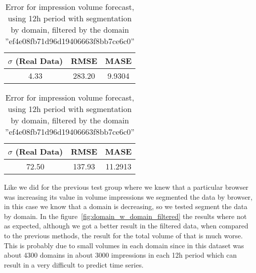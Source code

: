 \begin{table}[!ht]
\centering
\footnotesize
\begin{minipage}[t]{0.45\linewidth}
\centering
\footnotesize
\begin{tabular}{ccc}
 $\sigma$ (Real Data) & RMSE & MASE   \\ \hline
4.33 & 283.20 & 9.9304 \\
\end{tabular}

\vspace{0.5cm}

\caption[Error Volume
impression forecast, domain]{Error for impression volume
forecast, using 12h period with segmentation by domain}
\label{tab:err_domain_w_segmentation_domain}


\end{minipage}
\quad
\begin{minipage}[t]{0.45\linewidth}
\centering
\footnotesize
\begin{tabular}{ccc}
 $\sigma$ (Real Data) & RMSE & MASE   \\ \hline
72.50 & 137.93 & 11.2913 \\
\end{tabular}

\vspace{0.5cm}

\caption[Error Volume
impression forecast, domain, filtered]{Error for impression volume
forecast, using 12h period with segmentation by domain, filtered by the domain ''ef4e08fb71d96d19406663f8bb7ce6c0'' }
\label{tab:err_domain_w_segmentation_domain_filtered}


\end{minipage}

\end{table}

Like we did for the previous test group where we knew that a particular browser
was increasing its value in volume impressions we segmented the data by browser,
in this case we know that a domain is decreasing, so we tested segment the data
by domain. In the figure~\ref{fig:domain_w_domain_filtered} the results where
not as expected, although we got a better result in the filtered data, when
compared to the previous methods, the result for the total volume of that is
much worse. This is probably due to small volumes in each domain since in this
dataset was about 4300 domains in about 3000 impressions in each 12h period
which can result in a very difficult to predict time series.


